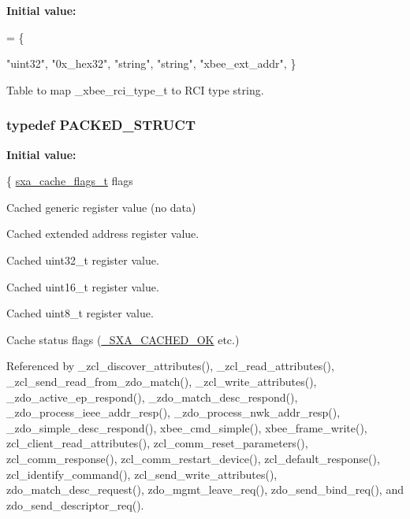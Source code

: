 {\bfseries Initial value\-:}
\begin{DoxyCode}
=
\{
   
   \textcolor{stringliteral}{"uint32"},
   \textcolor{stringliteral}{"0x\_hex32"},
   \textcolor{stringliteral}{"string"},
   \textcolor{stringliteral}{"string"},
   \textcolor{stringliteral}{"xbee\_ext\_addr"},
\}
\end{DoxyCode}


Table to map \-\_\-xbee\-\_\-rci\-\_\-type\-\_\-t to R\-C\-I type string. 

\hypertarget{group___s_x_a_ga4233297bd31be5c273d4fb0758cc54d7}{
\subsubsection[{P\-A\-C\-K\-E\-D\-\_\-\-S\-T\-R\-U\-C\-T}]{\setlength{\rightskip}{0pt plus 5cm}typedef P\-A\-C\-K\-E\-D\-\_\-\-S\-T\-R\-U\-C\-T}}\label{group___s_x_a_ga4233297bd31be5c273d4fb0758cc54d7}
{\bfseries Initial value\-:}
\begin{DoxyCode}
\{
   \hyperlink{group___s_x_a_ga21b45e50d83fcc1363c4239313e88c06}{sxa\_cache\_flags\_t}  flags
\end{DoxyCode}


Cached generic register value (no data) 

Cached extended address register value.

Cached uint32\-\_\-t register value.

Cached uint16\-\_\-t register value.

Cached uint8\-\_\-t register value.

Cache status flags (\hyperlink{group___s_x_a_gga0411cd49bb5b71852cecd93bcbf0ca2da54498f64b3ad7c2be423d32b45deac04}{\-\_\-\-S\-X\-A\-\_\-\-C\-A\-C\-H\-E\-D\-\_\-\-O\-K} etc.) 

Referenced by \-\_\-zcl\-\_\-discover\-\_\-attributes(), \-\_\-zcl\-\_\-read\-\_\-attributes(), \-\_\-zcl\-\_\-send\-\_\-read\-\_\-from\-\_\-zdo\-\_\-match(), \-\_\-zcl\-\_\-write\-\_\-attributes(), \-\_\-zdo\-\_\-active\-\_\-ep\-\_\-respond(), \-\_\-zdo\-\_\-match\-\_\-desc\-\_\-respond(), \-\_\-zdo\-\_\-process\-\_\-ieee\-\_\-addr\-\_\-resp(), \-\_\-zdo\-\_\-process\-\_\-nwk\-\_\-addr\-\_\-resp(), \-\_\-zdo\-\_\-simple\-\_\-desc\-\_\-respond(), xbee\-\_\-cmd\-\_\-simple(), xbee\-\_\-frame\-\_\-write(), zcl\-\_\-client\-\_\-read\-\_\-attributes(), zcl\-\_\-comm\-\_\-reset\-\_\-parameters(), zcl\-\_\-comm\-\_\-response(), zcl\-\_\-comm\-\_\-restart\-\_\-device(), zcl\-\_\-default\-\_\-response(), zcl\-\_\-identify\-\_\-command(), zcl\-\_\-send\-\_\-write\-\_\-attributes(), zdo\-\_\-match\-\_\-desc\-\_\-request(), zdo\-\_\-mgmt\-\_\-leave\-\_\-req(), zdo\-\_\-send\-\_\-bind\-\_\-req(), and zdo\-\_\-send\-\_\-descriptor\-\_\-req().

